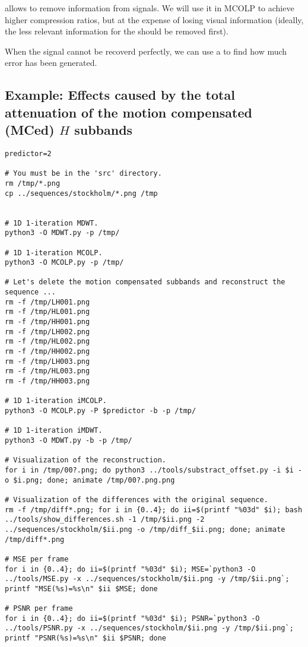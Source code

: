  allows to remove information from
signals. We will use it in MCOLP to achieve higher compression ratios,
but at the expense of losing visual information (ideally, the less
relevant information for the  should
be removed first).

When the signal cannot be recoverd perfectly, we can use a
 to find how much error
has been generated.


\subsection{Example: Effects caused by the total attenuation of the motion compensated (MCed) $H$ subbands}

\begin{verbatim}
predictor=2

# You must be in the 'src' directory.
rm /tmp/*.png
cp ../sequences/stockholm/*.png /tmp


# 1D 1-iteration MDWT.
python3 -O MDWT.py -p /tmp/

# 1D 1-iteration MCOLP.
python3 -O MCOLP.py -p /tmp/

# Let's delete the motion compensated subbands and reconstruct the sequence ...
rm -f /tmp/LH001.png
rm -f /tmp/HL001.png
rm -f /tmp/HH001.png
rm -f /tmp/LH002.png
rm -f /tmp/HL002.png
rm -f /tmp/HH002.png
rm -f /tmp/LH003.png
rm -f /tmp/HL003.png
rm -f /tmp/HH003.png

# 1D 1-iteration iMCOLP.
python3 -O MCOLP.py -P $predictor -b -p /tmp/

# 1D 1-iteration iMDWT.
python3 -O MDWT.py -b -p /tmp/

# Visualization of the reconstruction.
for i in /tmp/00?.png; do python3 ../tools/substract_offset.py -i $i -o $i.png; done; animate /tmp/00?.png.png

# Visualization of the differences with the original sequence.
rm -f /tmp/diff*.png; for i in {0..4}; do ii=$(printf "%03d" $i); bash ../tools/show_differences.sh -1 /tmp/$ii.png -2 ../sequences/stockholm/$ii.png -o /tmp/diff_$ii.png; done; animate /tmp/diff*.png

# MSE per frame
for i in {0..4}; do ii=$(printf "%03d" $i); MSE=`python3 -O ../tools/MSE.py -x ../sequences/stockholm/$ii.png -y /tmp/$ii.png`; printf "MSE(%s)=%s\n" $ii $MSE; done

# PSNR per frame
for i in {0..4}; do ii=$(printf "%03d" $i); PSNR=`python3 -O ../tools/PSNR.py -x ../sequences/stockholm/$ii.png -y /tmp/$ii.png`; printf "PSNR(%s)=%s\n" $ii $PSNR; done
\end{verbatim}

